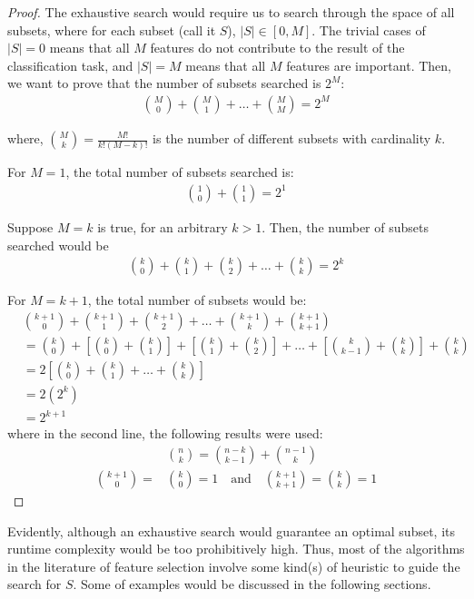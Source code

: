 \documentclass[12pt, twoside, a4paper]{article}
\begin{document}
\begin{proof}
The exhaustive search would require us to search through the space of all subsets, where for each subset (call it $S$), $|S| \in \left[ 0, M \right]$.  The trivial cases of $|S|=0$ means that all $M$ features do not contribute to the result of the classification task, and $|S|=M$ means that all $M$ features are important. Then, we want to prove that the number of subsets searched is $2^M$:
\begin{align*}
{{M}\choose{0}} + {{M}\choose{1}} + \dots + {{M}\choose{M}} = 2^M
\end{align*}

where, ${{M}\choose{k}} = \frac{M!}{k!(M-k)!}$ is the number of different subsets with cardinality $k$. 

For $M=1$, the total number of subsets searched is:
\begin{align*}
{{1}\choose{0}} + {{1}\choose{1}} = 2^1
\end{align*}

Suppose $M=k$ is true, for an arbitrary $k>1$. Then, the number of subsets searched would be
\begin{align*}
{{k}\choose{0}} + {{k}\choose{1}} + {{k}\choose{2}} + \dots + {{k}\choose{k}} = 2^k 
\end{align*}

For $M=k+1$, the total number of subsets would be:
\begin{align*}
&{{k+1}\choose{0}} + {{k+1}\choose{1}} + {{k+1}\choose{2}} + \dots + {{k+1}\choose{k}} + {{k+1}\choose{k+1}} \\
&= {{k}\choose{0}} + \left[ {{k}\choose{0}} + {{k}\choose{1}} \right] + \left[ {{k}\choose{1}} + {{k}\choose{2}} \right] + \dots + \left[ {{k}\choose{k-1}} + {{k}\choose{k}} \right] + {{k}\choose{k}} \\
&= 2 \left[ {{k}\choose{0}} + {{k}\choose{1}} + \dots + {{k}\choose{k}} \right] \\
&= 2 \left(2^k \right) \\
&= 2^{k+1}
\end{align*}
where in the second line, the following results were used:
\begin{align*}
&{{n}\choose{k}} = {{n-k}\choose{k-1}} + {{n-1}\choose{k}} \\
{{k+1}\choose{0}} = &{{k}\choose{0}} = 1 \quad \text{and} \quad {{k+1}\choose{k+1}} = {{k}\choose{k}} = 1
\end{align*}
\end{proof}

Evidently, although an exhaustive search would guarantee an optimal subset, its runtime complexity would be too prohibitively high. Thus, most of the algorithms in the literature of feature selection involve some kind(s) of heuristic to guide the search for $S$. Some of examples would be discussed in the following sections.
\end{document}
